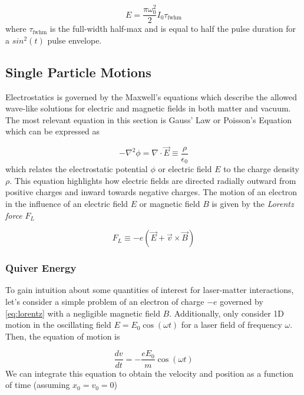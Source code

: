 \begin{equation}
	E = \frac{\pi \omega_0^2}{2} I_0 \tau_\text{fwhm} \label{eq:gaussian_beam_energy}
\end{equation}
where $\tau_\text{fwhm}$ is the full-width half-max and is equal to half the pulse duration for a $sin^2(t)$ pulse envelope. 

\subsection{Single Particle Motions}

Electrostatics is governed by the Maxwell's equations which describe the allowed wave-like solutions for electric and magnetic fields in both matter and vacuum. The most relevant equation in this section is Gauss' Law or Poisson's Equation which can be expressed as 

\begin{equation}
	- \nabla^2 \phi = \nabla \cdot \vec{E} \equiv \frac{\rho}{\epsilon_0} \label{eq:poisson}
\end{equation}
which relates the electrostatic potential $\phi$ or electric field $E$ to the charge density $\rho$. This equation highlights how electric fields are directed radially outward from positive charges and inward towards negative charges. The motion of an electron in the influence of an electric field $E$ or magnetic field $B$ is given by the \emph{Lorentz force} $F_L$

\begin{equation}
	F_L \equiv -e (\vec{E} + \vec{v} \times \vec{B}) \label{eq:lorentz}
\end{equation}

\subsubsection{Quiver Energy}
To gain intuition about some quantities of interest for laser-matter interactions, let's consider a simple problem of an electron of charge $-e$ governed by \cref{eq:lorentz} with a negligible magnetic field $B$. Additionally, only consider 1D motion in the oscillating field $E = E_0 \cos(\omega t)$ for a laser field of frequency $\omega$. Then, the equation of motion is

\begin{equation}
	\frac{d v}{d t} = - \frac{e E_0}{m} \cos(\omega t)
\end{equation}
We can integrate this equation to obtain the velocity and position as a function of time (assuming $x_0 = v_0 = 0$)

